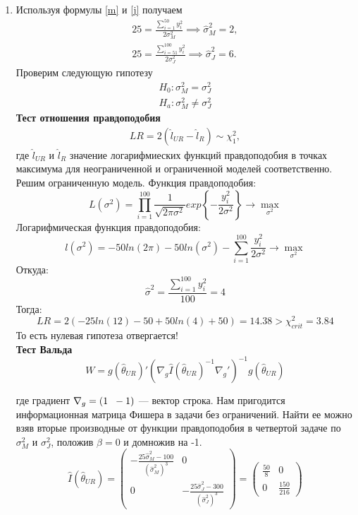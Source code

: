 \documentclass[12pt, a4paper]{article}
\begin{document}
\begin{enumerate}
\item
Используя формулы \eqref{m} и \eqref{j} получаем
\begin{eqnarray}
25 = \frac{\sum_{i=1}^{50} y_i^2} {2\sigma^2_M} \implies \hat\sigma_M^2 = 2, \\
25 = \frac{\sum_{i=51}^{100} y_i^2} {2\sigma^2_J} \implies \hat\sigma_J^2 = 6.
\end{eqnarray}
Проверим следующую гипотезу
\begin{eqnarray}
H_0 : \sigma_M^2 = \sigma_J^2 \\
H_a : \sigma_M^2 \neq \sigma_J^2
\end{eqnarray}
\textbf{Тест отношения правдоподобия}
\begin{eqnarray}
LR = 2 (\hat{l}_{UR} - \hat{l}_R) \sim \chi^2_{1},
\end{eqnarray}
где $\hat{l}_{UR}$ и $\hat{l}_R$ значение логарифмиеских функций правдоподобия в точках максимума для неограниченной и ограниченной моделей соответственно. Решим ограниченную модель. Функция правдоподобия:
\[
L(\sigma^2) = \prod\limits_{i=1}^{100}\frac{1}{\sqrt{2\pi\sigma^2}}exp\left\{-\frac{y_i^2}{2\sigma^2}\right\}  \to \max\limits_{\sigma^2}
\]
Логарифмическая функция правдоподобия:
\[
l(\sigma^2) = -50ln(2\pi) - 50ln(\sigma^2) - \sum\limits_{i=1}^{100}\frac{y_i^2}{2\sigma^2} \to \max\limits_{\sigma^2}
\]
Откуда:
\[
\hat{\sigma}^2 = \frac{\sum_{i=1}^{100}y_i^2}{100} = 4
\]
Тогда:
\[
LR = 2(-25ln(12) - 50 + 50ln(4) + 50) = 14.38 > \chi^2_{crit} = 3.84
\]
То есть нулевая гипотеза отвергается! \\
\textbf{Тест Вальда}
\[
W = g(\hat{\theta}_{UR})'(\nabla_g \hat{I}(\hat{\theta}_{UR})^{-1} \nabla_g')^{-1}g(\hat{\theta}_{UR})
\]

где градиент $\nabla_g = (1 \hspace{2mm} -1)$ — вектор строка. Нам пригодится информационная матрица Фишера в задачи без ограничений. Найти ее можно взяв вторые производные от функции правдоподобия в четвертой задаче по $\sigma^2_M$ и $\sigma^2_J$, положив $\beta = 0$ и домножив на -1.
\[
\hat{I}(\hat{\theta}_{UR}) =
\begin{pmatrix}
-\frac{25\hat{\sigma}^2_M - 100}{\left(\hat{\sigma}^2_M\right)^3} & 0 \\
0 & -\frac{25\hat{\sigma}^2_J - 300}{\left(\hat{\sigma}^2_J\right)^3}
\end{pmatrix}
=
\begin{pmatrix}
\frac{50}{8} & 0 \\
0 & \frac{150}{216}


\end{pmatrix}\]
\end{enumerate}
\end{document}
